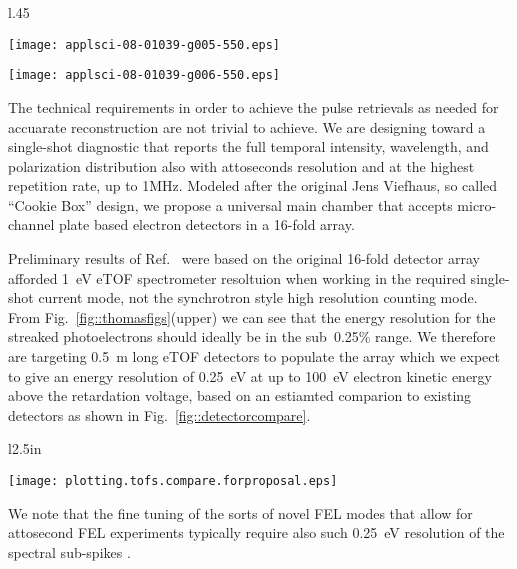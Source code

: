 \begin{wrapfigure}[24]{l}{.45\linewidth}
\vspace{-1\baselineskip}
\centerline{\texttt{[image: applsci-08-01039-g005-550.eps]}}
\centerline{\texttt{[image: applsci-08-01039-g006-550.eps]}}
\vspace{-1\baselineskip}
\caption{\label{fig::thomasfigs}Reproduced from Ref.~\cite{Feurer2018}. (upper) Xray pulse retrieval error versus \% energy resolution.  
(lower) Retrieval error versus angular sampling.}
\end{wrapfigure}

The technical requirements in order to achieve the pulse retrievals as needed for accuarate reconstruction are not trivial to achieve.
We are designing toward a single-shot diagnostic that reports the full temporal intensity, wavelength, and polarization distribution also with attoseconds resolution and at the highest repetition rate, up to 1MHz.  
Modeled after the original Jens Viefhaus, so called ``Cookie Box'' design, we propose a universal main chamber that accepts micro-channel plate based electron detectors in a 16-fold array.


Preliminary results of Ref.~\cite{Nick2018} were based on the original 16-fold detector array afforded 1~eV eTOF spectrometer resoltuion when working in the required single-shot current mode, not the synchrotron style high resolution counting mode.
From Fig.~\ref{fig::thomasfigs}(upper) we can see that the energy resolution for the streaked photoelectrons should ideally be in the sub~0.25\% range.
We therefore are targeting 0.5~m long eTOF detectors to populate the array which we expect to give an energy resolution of 0.25~eV at up to 100~eV electron kinetic energy above the retardation voltage, based on an estiamted comparion to existing detectors as shown in Fig.~\ref{fig::detectorcompare}.
\begin{wrapfigure}[15]{l}{2.5in}
\centerline{\texttt{[image: plotting.tofs.compare.forproposal.eps]}}
\vspace{-0.5\baselineskip}
\caption{\label{fig::detectorcompare}Detector resolution versus length comparison. }
\end{wrapfigure}
We note that the fine tuning of the sorts of novel FEL modes that allow for attosecond FEL experiments typically require also such 0.25~eV resolution of the spectral sub-spikes \cite{AlbertoPrivate}.

